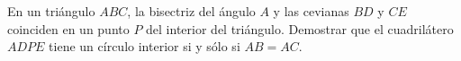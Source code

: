 En un triángulo $ABC$, la bisectriz del ángulo $A$ y las cevianas $BD$ y $CE$ coinciden en un punto $P$ del interior del triángulo. Demostrar que el cuadrilátero $ADPE$ tiene un círculo interior si y sólo si $AB=AC$.
